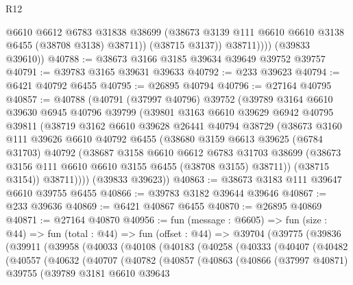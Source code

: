 \begin{lexlean}{R12}
\begin{coremodule}
                  @6610
                  @6612
                  @6783
                  @31838
                  @38699
                  (@38673 @3139 @111 @6610 @6610 @3138 @6455 (@38708 @3138) @38711))
                (@38715 @3137))
              @38711))))
      (@39833 @39610))
@40788 := @38673 @3166 @3185 @39634 @39649 @39752 @39757
@40791 := @39783 @3165 @39631 @39633
@40792 := @233 @39623
@40794 := @6421 @40792 @6455
@40795 := @26895 @40794
@40796 := @27164 @40795
@40857 := @40788
    (@40791
      (@37997 @40796)
      @39752
      (@39789
        @3164
        @6610
        @39630
        @6945
        @40796
        @39799
        (@39801
          @3163
          @6610
          @39629
          @6942
          @40795
          @39811
          (@38719
            @3162
            @6610
            @39628
            @26441
            @40794
            @38729
            (@38673
              @3160
              @111
              @39626
              @6610
              @40792
              @6455
              (@38680
                @3159
                @6613
                @39625
                (@6784 @31703)
                @40792
                (@38687
                  @3158
                  @6610
                  @6612
                  @6783
                  @31703
                  @38699
                  (@38673 @3156 @111 @6610 @6610 @3155 @6455 (@38708 @3155) @38711))
                (@38715 @3154))
              @38711))))
      (@39833 @39623))
@40863 := @38673 @3183 @111 @39647 @6610 @39755 @6455
@40866 := @39783 @3182 @39644 @39646
@40867 := @233 @39636
@40869 := @6421 @40867 @6455
@40870 := @26895 @40869
@40871 := @27164 @40870
@40956 := fun (message : @6605) =>
  fun (size : @44) =>
  fun (total : @44) =>
  fun (offset : @44) =>
  @39704
    (@39775
      (@39836
        (@39911
          (@39958
            (@40033
              (@40108
                (@40183
                  (@40258
                    (@40333
                      (@40407
                        (@40482
                          (@40557
                            (@40632
                              (@40707
                                (@40782
                                  (@40857
                                    (@40863
                                      (@40866
                                        (@37997 @40871)
                                        @39755
                                        (@39789
                                          @3181
                                          @6610
                                          @39643

\end{coremodule}
\end{lexlean}
